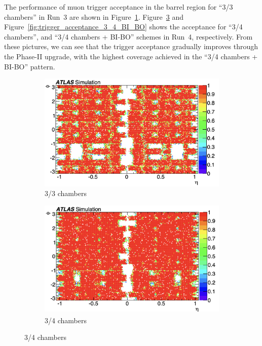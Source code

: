 The performance of muon trigger acceptance in the barrel region for ``3/3 chambers'' in Run~3  are shown in Figure~\ref{fig:trigger_acceptance_3_3}. Figure~\ref{fig:trigger_acceptance_3_4} and Figure~\ref{fig:trigger_acceptance_3_4_BI_BO} shows the acceptance for ``3/4 chambers'', and ``3/4 chambers + BI-BO'' schemes in Run~4, respectively. From these pictures, we can see that the trigger acceptance gradually improves through the Phase-II upgrade, with the highest coverage achieved in the ``3/4 chambers + BI-BO'' pattern.



\begin{figure}[htbp]
  \centering
  \begin{subfigure}{0.70\textwidth}
    \includegraphics[width=\textwidth]{figs/chapter4/trigger_acceptance_map_3_3.png}
    \caption{3/3 chambers}
    \label{fig:trigger_acceptance_3_3}
  \end{subfigure}


  \begin{subfigure}{0.70\textwidth}
    \includegraphics[width=\textwidth]{figs/chapter4/trigger_acceptance_map_3_4.png}
    \caption{3/4 chambers}
    \label{fig:trigger_acceptance_3_4}
  \end{subfigure}


\end{figure}
